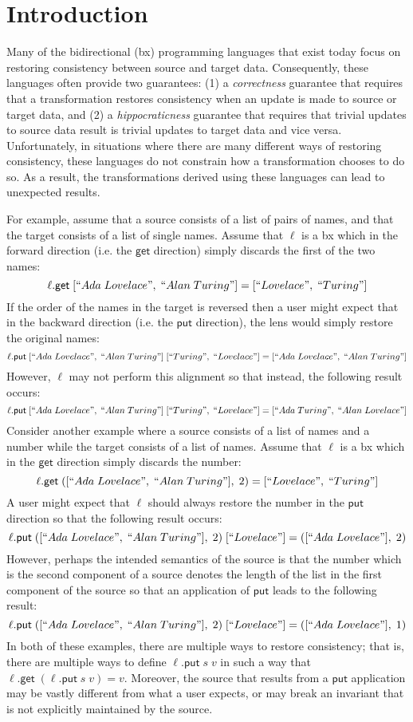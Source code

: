 \documentclass[acmsmall,review,anonymous]{acmart}\settopmatter{printfolios=true,printccs=false,printacmref=false}
\theoremstyle{definition}
\newcommand{\kw}[1]{\ensuremath{\mathsf{#1}}\xspace}
\newcommand{\get}{\ensuremath{\kw{get}}\xspace}
\newcommand{\pput}{\ensuremath{\kw{put}}\xspace}
\begin{document}
\section{Introduction}
Many of the bidirectional (bx) programming languages that exist today focus on
restoring consistency between source and target data. Consequently, these languages often provide two guarantees: (1) a {\em correctness} guarantee that requires that a transformation restores consistency when an update is made to source or target data, and (2) a {\em hippocraticness} guarantee that requires that trivial updates to source data result is trivial updates to target data and vice versa. Unfortunately, in situations
where there are many different ways of restoring consistency, these languages
do not constrain how a transformation chooses to do so. As a result, the transformations derived using these languages can lead to unexpected results.

For example, assume that a source consists of a list of pairs of names, and that the target consists of a list of single names. Assume that $\ell$ is a bx which in the forward direction (i.e. the \get direction) simply discards the first of the two names:
$$\ell.\get \; [``Ada \; Lovelace", \; ``Alan \; Turing"] = [``Lovelace", \; ``Turing"]$$
If the order of the names in the target is reversed then a user might expect that in the backward direction (i.e. the \pput direction), the lens would simply restore the original names:
$$\ell.\pput \; [``Ada \; Lovelace", \; ``Alan \; Turing"] \; [``Turing", \; ``Lovelace"] = [``Ada \; Lovelace", \; ``Alan \; Turing"]$$
However, $\ell$ may not perform this alignment so that instead, the following result occurs:
$$\ell.\pput \; [``Ada \; Lovelace", \; ``Alan \; Turing"] \; [``Turing", \; ``Lovelace"] = [``Ada \; Turing", \; ``Alan \; Lovelace"]$$
Consider another example where a source consists of a list of names and a number while the target consists of a list of names. Assume that $\ell$ is a bx which in the \get direction simply discards the number:
$$\ell.\get \; ([``Ada \; Lovelace", \; ``Alan \; Turing"], \; 2)  = [``Lovelace", \; ``Turing"]$$
A user might expect that $\ell$ should always restore the number in the \pput direction so that the following result occurs:
$$\ell.\pput \; ([``Ada \; Lovelace", \; ``Alan \; Turing"], \; 2) \; [``Lovelace"] = ([``Ada \; Lovelace"], \; 2)$$
However, perhaps the intended semantics of the source is that the number which is the second component of a source denotes the length of the list in the first component of the source so that an application of \pput leads to the following result:
$$\ell.\pput \; ([``Ada \; Lovelace", \; ``Alan \; Turing"], \; 2) \; [``Lovelace"] = ([``Ada \; Lovelace"], \; 1)$$
In both of these examples, there are multiple ways to restore consistency; that is, there are multiple ways to define $\ell.\pput \; s \; v$ in such a way that $\ell.\get \; (\ell.\pput \; s \; v) = v$. Moreover, the source that results from a \pput application may be vastly different from what a user expects, or may break an invariant that is not explicitly maintained by the source.
\end{document}
